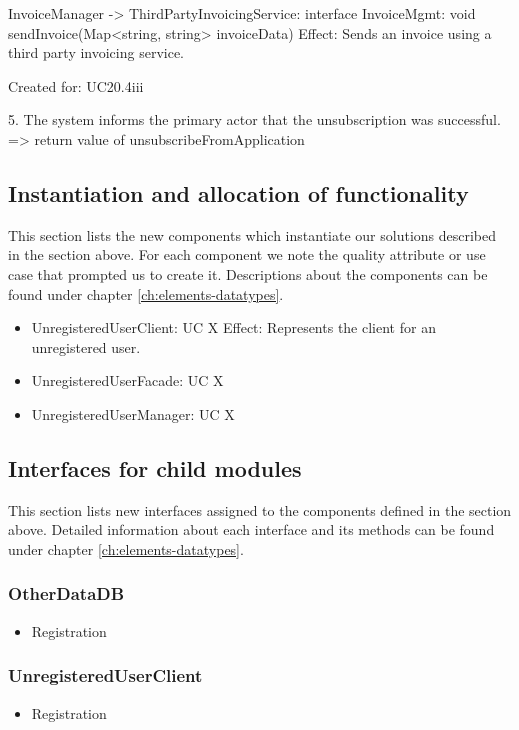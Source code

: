 {{{{{{{{{{{{{{                InvoiceManager -> ThirdPartyInvoicingService: interface InvoiceMgmt: void sendInvoice(Map<string, string> invoiceData)
                    Effect: Sends an invoice using a third party invoicing service.
                    \item Created for: UC20.4iii

        5. The system informs the primary actor that the unsubscription was successful.
            => return value of unsubscribeFromApplication


\subsection{Instantiation and allocation of functionality}
    This section lists the new components which instantiate our solutions
    described in the section above. For each component we note the quality
    attribute or use case that prompted us to create it. Descriptions about
    the components can be found under chapter \ref{ch:elements-datatypes}. \\

    \begin{itemize}
        \item UnregisteredUserClient: UC X
              Effect: Represents the client for an unregistered user.
        \item UnregisteredUserFacade: UC X
        \item UnregisteredUserManager: UC X
    \end{itemize}


\subsection{Interfaces for child modules}
    This section lists new interfaces assigned to the components defined
    in the section above. Detailed information about each interface and
    its methods can be found under chapter \ref{ch:elements-datatypes}. \\

    \subsubsection{OtherDataDB}
        \begin{itemize}
            \item Registration
        \end{itemize}
    \subsubsection{UnregisteredUserClient}
        \begin{itemize}
            \item Registration
        \end{itemize}
}}}}}}}}}}}}}}
